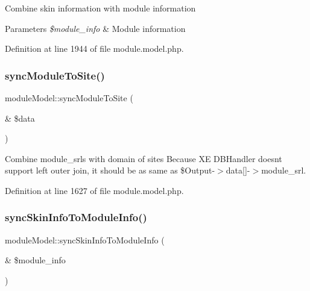 Combine skin information with module information 
\begin{DoxyParams}{Parameters}
{\em \$module\+\_\+info} & Module information \\
\hline
\end{DoxyParams}


Definition at line 1944 of file module.\+model.\+php.

\hypertarget{classmoduleModel_ab51d556817682d653b92e09a34b138d6}{}\label{classmoduleModel_ab51d556817682d653b92e09a34b138d6} 
\subsubsection{\texorpdfstring{sync\+Module\+To\+Site()}{syncModuleToSite()}}
{\footnotesize\ttfamily module\+Model\+::sync\+Module\+To\+Site (\begin{DoxyParamCaption}\item[{\&}]{\$data }\end{DoxyParamCaption})}



Combine module\+\_\+srls with domain of sites Because XE D\+B\+Handler doesn\textquotesingle{}t support left outer join, it should be as same as \$\+Output-\/$>$data\mbox{[}\mbox{]}-\/$>$module\+\_\+srl. 



Definition at line 1627 of file module.\+model.\+php.

\hypertarget{classmoduleModel_af9179765de4796b45236b62be16eb8fb}{}\label{classmoduleModel_af9179765de4796b45236b62be16eb8fb} 
\subsubsection{\texorpdfstring{sync\+Skin\+Info\+To\+Module\+Info()}{syncSkinInfoToModuleInfo()}}
{\footnotesize\ttfamily module\+Model\+::sync\+Skin\+Info\+To\+Module\+Info (\begin{DoxyParamCaption}\item[{\&}]{\$module\+\_\+info }\end{DoxyParamCaption})}




